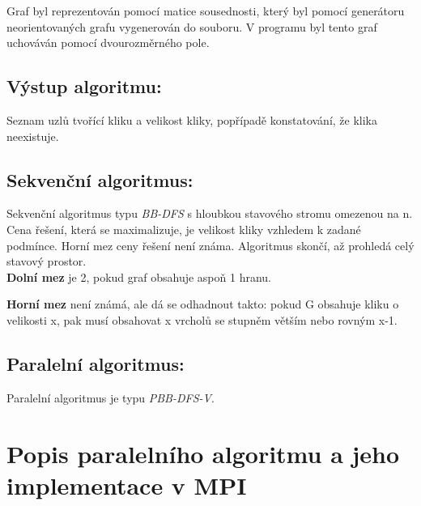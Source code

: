 \documentclass[11pt]{article}
\begin{document}
Graf byl reprezentován pomocí matice sousednosti, který byl pomocí generátoru neorientovaných grafu vygenerován do souboru. V programu byl tento graf uchováván pomocí dvourozměrného pole.

\subsection{Výstup algoritmu:}
Seznam uzlů tvořící kliku a velikost kliky, popřípadě konstatování, že klika neexistuje.

\subsection{Sekvenční algoritmus:}
Sekvenční algoritmus typu \textit{BB-DFS} s hloubkou stavového stromu omezenou na n. Cena řešení, která se maximalizuje, je velikost kliky vzhledem k zadané podmínce. Horní mez ceny řešení není známa. Algoritmus skončí, až prohledá celý stavový prostor. \\

\textbf{Dolní mez} je 2, pokud graf obsahuje aspoň 1 hranu.

\textbf{Horní mez} není známá, ale dá se odhadnout takto: pokud G obsahuje kliku o velikosti x, pak musí obsahovat x vrcholů se stupněm větším nebo rovným x-1.

\subsection{Paralelní algoritmus:}
Paralelní algoritmus je typu \textit{PBB-DFS-V}.

\section{Popis paralelního algoritmu a jeho implementace v MPI}

\end{document}
